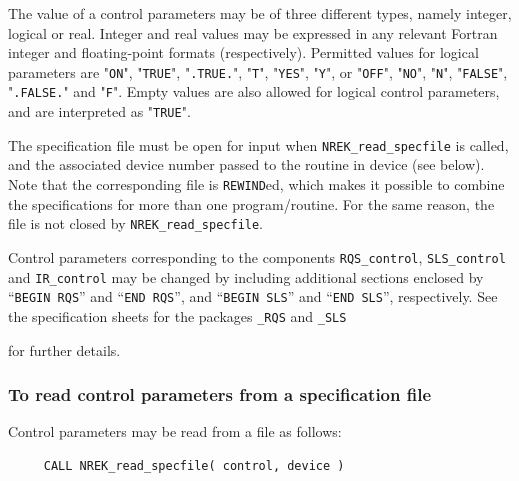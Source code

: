 \documentclass{galahad}
\newcommand{\packagename}{NREK}
\begin{document}
The value of a control parameters may be of three different types, namely
integer, logical or real.
Integer and real values may be expressed in any relevant Fortran integer and
floating-point formats (respectively). Permitted values for logical
parameters are "{\tt ON}", "{\tt TRUE}", "{\tt .TRUE.}", "{\tt T}",
"{\tt YES}", "{\tt Y}", or "{\tt OFF}", "{\tt NO}",
"{\tt N}", "{\tt FALSE}", "{\tt .FALSE.}" and "{\tt F}".
Empty values are also allowed for
logical control parameters, and are interpreted as "{\tt TRUE}".

The specification file must be open for
input when {\tt \packagename\_read\_specfile}
is called, and the associated device number
passed to the routine in device (see below).
Note that the corresponding
file is {\tt REWIND}ed, which makes it possible to combine the specifications
for more than one program/routine.  For the same reason, the file is not
closed by {\tt \packagename\_read\_specfile}.

Control parameters corresponding to the components
{\tt RQS\_control},
{\tt SLS\_control}
and
{\tt IR\_control} may be changed by including additional sections enclosed by
``{\tt BEGIN RQS}'' and
``{\tt END RQS}'', and
``{\tt BEGIN SLS}'' and
``{\tt END SLS}'', respectively.
See the specification sheets for the packages
{\tt \libraryname\_RQS}
and
{\tt \libraryname\_SLS}

for further details.

\subsubsection{To read control parameters from a specification file}
\label{readspec}

Control parameters may be read from a file as follows:
\hskip0.5in
\def\baselinestretch{0.8} {\tt \begin{verbatim}
     CALL NREK_read_specfile( control, device )
\end{verbatim}}
\def\baselinestretch{1.0}
\end{document}
